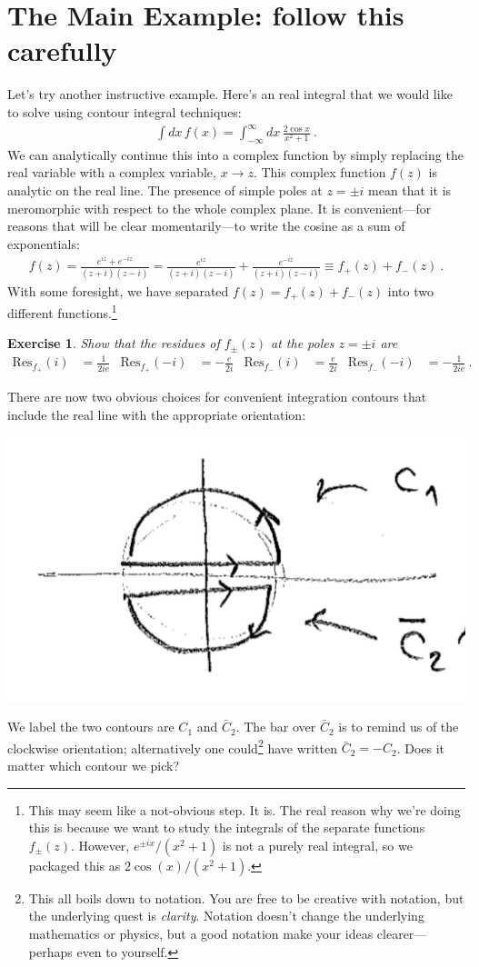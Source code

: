 \documentclass[
  11pt,
	colorful,
	raggedright,
]{tufte-style-thesis-flip}
\newtheorem{exercise}{Exercise}[section]
\begin{document}
\section{The Main Example: follow this carefully}
Let's try another instructive example. Here's an real integral that we would like to solve using contour integral techniques:
\begin{align}
\int dx\, f(x) = \int_{-\infty}^\infty  dx\,
\frac{2\cos x}{x^2+1} \ .
\end{align}
We can analytically continue this into a complex function by simply replacing the real variable with a complex variable, $x\to z$. This complex function $f(z)$ is analytic on the real line. The presence of simple poles at $z=\pm i$ mean that it is meromorphic with respect to the whole complex plane. It is convenient---for reasons that will be clear momentarily---to write the cosine as a sum of exponentials:
\begin{align}
  f(z) 
  = \frac{e^{iz}+e^{-iz}}{(z+i)(z-i)} 
  = \frac{e^{iz}}{(z+i)(z-i)} + \frac{e^{-iz}}{(z+i)(z-i)} 
  \equiv f_+(z) + f_-(z)
  \ .
\end{align}
With some foresight, we have separated $f(z)=f_+(z)+f_-(z)$ into two different functions.\footnote{This may seem like a not-obvious step. It is. The real reason why we're doing this is because we want to study the integrals of the separate functions $f_\pm(z)$. However, $e^{\pm ix}/(x^2+1)$ is not a purely real integral, so we packaged this as $2\cos(x)/(x^2+1)$.}

\begin{exercise}
Show that the residues of $f_\pm(z)$ at the poles $z=\pm i$ are
\begin{align}
  \text{Res}_{f_+}(i) &= \frac{1}{2ie}
  &
  \text{Res}_{f_+}(-i) &= -\frac{e}{2i}
  &
  \text{Res}_{f_-}(i) &= \frac{e}{2i}
  &
  \text{Res}_{f_-}(-i) &= -\frac{1}{2ie} \ .
\end{align}

\end{exercise}

There are now two obvious choices for convenient integration contours that include the real line with the appropriate orientation:
\begin{center}
\includegraphics[width=.5\textwidth]{figures/Lec_2017_14_whichcontour.png}
\end{center}
We label the two contours are $C_1$ and $\bar C_2$. The bar over $\bar C_2$ is to remind us of the clockwise orientation; alternatively one could\footnote{This all boils down to notation. You are free to be creative with notation, but the underlying quest is \emph{clarity}. Notation doesn't change the underlying mathematics or physics, but a good notation make your ideas clearer---perhaps even to yourself.} have written $\bar C_2 = -C_2$.  Does it matter which contour we pick?
\end{document}

